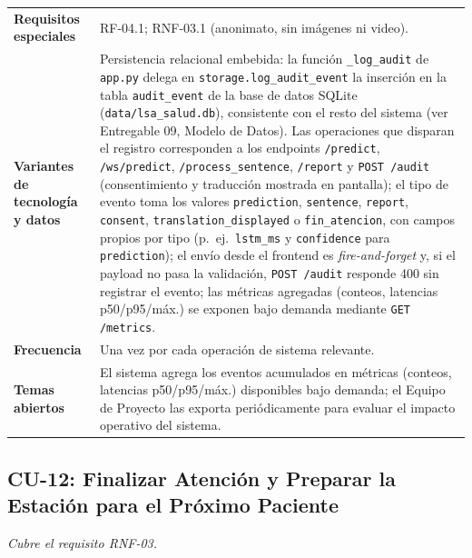 \begin{longtable}{@{}>{\raggedright\arraybackslash}p{4.1cm} >{\raggedright\arraybackslash}p{\dimexpr\textwidth-4.1cm-2\tabcolsep\relax}@{}}
\textbf{Requisitos especiales} & RF-04.1; RNF-03.1 (anonimato, sin imágenes ni video). \\
\textbf{Variantes de tecnología y datos} &
Persistencia relacional embebida: la función \texttt{\_log\_audit} de
\texttt{app.py} delega en \texttt{storage.log\_audit\_event} la inserción en
la tabla \texttt{audit\_event} de la base de datos SQLite
(\texttt{data/lsa\_salud.db}), consistente con el resto del sistema (ver
Entregable 09, Modelo de Datos). Las
operaciones que disparan el registro corresponden a los endpoints
\texttt{/predict}, \texttt{/ws/predict}, \texttt{/process\_sentence},
\texttt{/report} y \texttt{POST /audit} (consentimiento y traducción
mostrada en pantalla); el tipo de evento toma los valores
\texttt{prediction}, \texttt{sentence}, \texttt{report}, \texttt{consent},
\texttt{translation\_displayed} o \texttt{fin\_atencion}, con campos
propios por tipo (p.\ ej.\ \texttt{lstm\_ms} y \texttt{confidence} para
\texttt{prediction}); el envío desde el frontend es \textit{fire-and-forget}
y, si el payload no pasa la validación, \texttt{POST /audit} responde 400
sin registrar el evento; las métricas agregadas (conteos, latencias
p50/p95/máx.) se exponen bajo demanda mediante \texttt{GET /metrics}. \\
\textbf{Frecuencia} & Una vez por cada operación de sistema relevante. \\
\textbf{Temas abiertos} &
El sistema agrega los eventos acumulados en métricas (conteos, latencias
p50/p95/máx.) disponibles bajo demanda; el Equipo de Proyecto las exporta
periódicamente para evaluar el impacto operativo del sistema. \\
\bottomrule
\end{longtable}

\subsection{CU-12: Finalizar Atención y Preparar la Estación para el Próximo Paciente}
\textit{Cubre el requisito RNF-03.}

